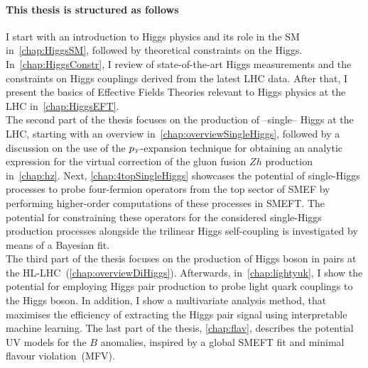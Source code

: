 \paragraph{This thesis is structured as follows\color{Cayenne}{:}}
I start with an introduction to Higgs physics and its role in the SM in~\autoref{chap:HiggsSM}, followed by theoretical constraints on the Higgs. In~\autoref{chap:HiggsConstr}, I review of  state-of-the-art Higgs measurements and the constraints on Higgs couplings derived from the latest LHC data. After that, I present the basics of Effective Fields Theories relevant to Higgs physics at the LHC in~\autoref{chap:HiggsEFT}. \\ The second part of the thesis focuses on the production of --single-- Higgs at the LHC, starting with an overview in~\autoref{chap:overviewSingleHiggs}, followed by a discussion on the use of the $p_{\scriptscriptstyle T}$-expansion technique for obtaining an analytic expression for the virtual correction of the gluon fusion $Zh$ production in~\autoref{chap:hz}. Next, \autoref{chap:4topSingleHiggs} showcases the potential of single-Higgs processes to probe four-fermion operators from the top sector of SMEF by performing higher-order computations of these processes in SMEFT. The potential for constraining these operators for the considered single-Higgs production processes alongside the trilinear Higgs self-coupling is investigated by means of a Bayesian fit. \\ The third part of the thesis focuses on the production of Higgs boson in pairs at the HL-LHC~(\autoref{chap:overviewDiHiggs}). Afterwards, in~\autoref{chap:lightyuk}, I show the potential for employing Higgs pair production to probe light quark couplings to the Higgs boson. In addition, I show a multivariate analysis method, that maximises the efficiency of extracting the Higgs pair signal using interpretable machine learning.  The last part of the thesis, \autoref{chap:flav}, describes the potential UV models for the $B$ anomalies, inspired by a global SMEFT fit and minimal flavour violation~(MFV). 









